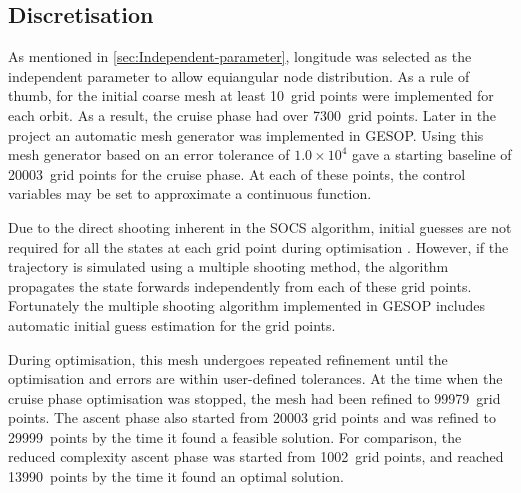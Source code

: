 \subsection{Discretisation} \label{sub:Discretisation}
As mentioned in \autoref{sec:Independent-parameter}, longitude was selected as the independent parameter to allow equiangular node distribution. As a rule of thumb, for the initial coarse mesh at least 10~grid points were implemented for each orbit. As a result, the cruise phase had over 7300~grid points. Later in the project an automatic mesh generator was implemented in GESOP. Using this mesh generator based on an error tolerance of $1.0\times10^4$ gave a starting baseline of 20003~grid points for the cruise phase. At each of these points, the control variables may be set to approximate a continuous function. 

Due to the direct shooting inherent in the SOCS algorithm, initial guesses are not required for all the states at each grid point during optimisation \parencite{SOCS_guide}. However, if the trajectory is simulated using a multiple shooting method, the algorithm propagates the state forwards independently from each of these grid points. Fortunately the multiple shooting algorithm implemented in GESOP includes automatic initial guess estimation for the grid points.

During optimisation, this mesh undergoes repeated refinement until the optimisation and errors are within user-defined tolerances. At the time when the cruise phase optimisation was stopped, the mesh had been refined to 99979~grid points. The ascent phase also started from 20003 grid points and was refined to 29999~points by the time it found a feasible solution. For comparison, the reduced complexity ascent phase was started from 1002~grid points, and reached 13990~points by the time it found an optimal solution.





